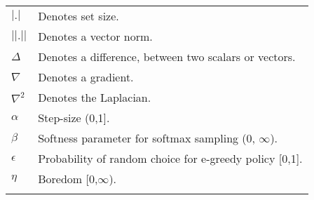 \begin{table}[]
\begin{tabular}{ll}
    $|.|$ & Denotes set size. \\
    $||.||$ & Denotes a vector norm. \\
    $\Delta$ & Denotes a difference, between two scalars or vectors. \\
    $\nabla$ & Denotes a gradient. \\
    $\nabla^2$ & Denotes the Laplacian. \\
    $\alpha$ & Step-size (0,1]. \\
    $\beta$ & Softness parameter for softmax sampling (0, $\infty$). \\
    $\epsilon$ & Probability of random choice for e-greedy policy [0,1]. \\
    $\eta$ & Boredom [0,$\infty$). \\
    &                          
    \end{tabular}
\end{table}
